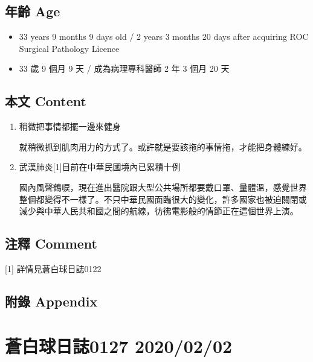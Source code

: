 \documentclass[
]{article}
\providecommand{\tightlist}{%
  \setlength{\itemsep}{0pt}\setlength{\parskip}{0pt}}
\begin{document}
\hypertarget{ux5e74ux9f61-age-62}{%
\subsection{年齡 Age}\label{ux5e74ux9f61-age-62}}

\begin{itemize}
\tightlist
\item
  33 years 9 months 9 days old / 2 years 3 months 20 days after
  acquiring ROC Surgical Pathology Licence
\item
  33 歲 9 個月 9 天 / 成為病理專科醫師 2 年 3 個月 20 天
\end{itemize}

\hypertarget{ux672cux6587-content-62}{%
\subsection{本文 Content}\label{ux672cux6587-content-62}}

\begin{enumerate}
\def\labelenumi{\arabic{enumi}.}
\item
  稍微把事情都擺一邊來健身

  就稍微抓到肌肉用力的方式了。或許就是要該拖的事情拖，才能把身體練好。
\item
  武漢肺炎{[}1{]}目前在中華民國境內已累積十例

  國內風聲鶴唳，現在進出醫院跟大型公共場所都要戴口罩、量體溫，感覺世界整個都變得不一樣了。不只中華民國面臨很大的變化，許多國家也被迫關閉或減少與中華人民共和國之間的航線，彷彿電影般的情節正在這個世界上演。
\end{enumerate}

\hypertarget{ux6ce8ux91cb-comment-61}{%
\subsection{注釋 Comment}\label{ux6ce8ux91cb-comment-61}}

{[}1{]} 詳情見蒼白球日誌0122

\hypertarget{ux9644ux9304-appendix-62}{%
\subsection{附錄 Appendix}\label{ux9644ux9304-appendix-62}}

\hypertarget{ux84bcux767dux7403ux65e5ux8a8c0127-20200202}{%
\section{蒼白球日誌0127
2020/02/02}\label{ux84bcux767dux7403ux65e5ux8a8c0127-20200202}}
\end{document}
